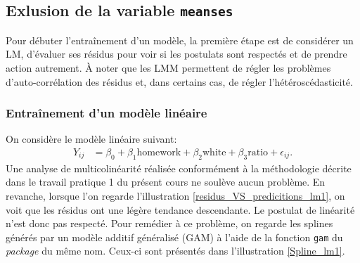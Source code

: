\documentclass{article}
\begin{document}
\renewcommand\thesubsection{\thesection\alph{subsection})}
\subsection{Exlusion de la variable \texttt{meanses}}\label{Qst1_a}
	Pour débuter l'entraînement d'un modèle, la première étape est de considérer un LM, d'évaluer ses résidus pour voir si les postulats sont respectés et de prendre action autrement. À noter que les LMM permettent de régler les problèmes d'auto-corrélation des résidus et, dans certains cas, de régler l'hétéroscédasticité.
	
	\subsubsection*{Entraînement d'un modèle linéaire}
		On considère le modèle linéaire suivant:
		\begin{align}\label{lm_1}
			Y_{ij} &= \beta_0 + \beta_1 \mathrm{homework} + \beta_2 \mathrm{white} + \beta_3 \mathrm{ratio} + \epsilon_{ij}.
		\end{align}
		Une analyse de multicolinéarité réalisée conformément à la méthodologie décrite dans le travail pratique 1 du présent cours ne soulève aucun problème. En revanche, lorsque l'on regarde l'illustration \ref{residus_VS_predicitions_lm1}, on voit que les résidus ont une légère tendance descendante. Le postulat de linéarité n'est donc pas respecté. Pour remédier à ce problème, on regarde les splines générés par un modèle additif généralisé (GAM) à l'aide de la fonction \texttt{gam} du \textit{package} du même nom. Ceux-ci sont présentés dans l'illustration \ref{Spline_lm1}.
		
\end{document}
